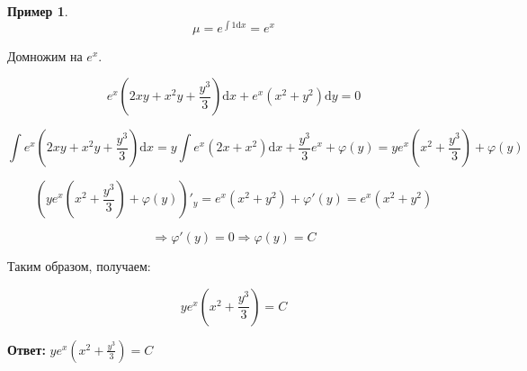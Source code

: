 \documentclass[a4paper, 14pt]{article}
\newcommand{\dx}{\mathrm{d}x}
\newcommand{\dy}{\mathrm{d}y}
\renewcommand{\phi}{\varphi}
\theoremstyle{definition}
\newtheorem*{example}{Пример}
\newenvironment{answer}
  {\par\noindent\textbf{Ответ:}}
  {\par}
\begin{document}
\begin{itemize}
\begin{example}
        \[\mu = e^{\int{1}\dx}= e^x\]

        Домножим на $e^x$.

        \[e^x(2xy+x^2y+\frac{y^3}{3})\dx +e^x(x^2+y^2)\dy = 0 \]

        \[\int{e^x(2xy+x^2y+\frac{y^3}{3})}\dx = y\int{e^x(2x+x^2)}\dx + \frac{y^3}{3}e^x + \phi(y) = ye^x(x^2+\frac{y^3}{3}) + \phi(y)\]

        \[(ye^x(x^2+\frac{y^3}{3}) + \phi(y))'_y = e^x(x^2+y^2) + \phi'(y) = e^x(x^2+y^2)\]

        \[\Longrightarrow \phi'(y) = 0 \Longrightarrow \phi(y) = C\]

        Таким образом, получаем:

        \[ye^x(x^2+\frac{y^3}{3}) = C\]
    \end{example}
    \begin{answer}
        $ye^x(x^2+\frac{y^3}{3}) = C$
    \end{answer}
\end{itemize}
\end{document}
